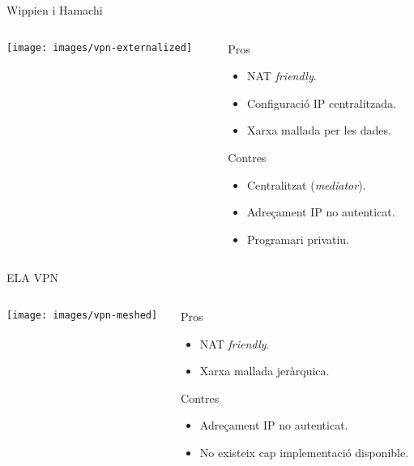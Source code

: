     \begin{frame}{Wippien i Hamachi}
        \begin{columns}
        \begin{column}{0.35\textwidth}
        \texttt{[image: images/vpn-externalized]}
        \end{column}
        \begin{column}{0.65\textwidth}
    	\begin{exampleblock}{Pros}\small
		\begin{itemize}
\item NAT \emph{friendly}.
\item Configuració IP centralitzada.
\item Xarxa mallada per les dades.
		\end{itemize}
	    \end{exampleblock}
	    \begin{alertblock}{Contres}\small
		\begin{itemize}
\item Centralitzat (\emph{mediator}).
\item Adreçament IP no autenticat.
\item Programari privatiu.
		\end{itemize}
       	\end{alertblock}
        \end{column}
        \end{columns}
    \end{frame}
    \begin{frame}{ELA VPN}
        \begin{columns}
        \begin{column}{0.35\textwidth}
        \texttt{[image: images/vpn-meshed]}
        \end{column}
        \begin{column}{0.65\textwidth}
    	\begin{exampleblock}{Pros}\small
		\begin{itemize}
\item NAT \emph{friendly}.
\item Xarxa mallada jeràrquica.
		\end{itemize}
	    \end{exampleblock}
	    \begin{alertblock}{Contres}\small
		\begin{itemize}
\item Adreçament IP no autenticat.
\item No existeix cap implementació disponible.
		\end{itemize}
       	\end{alertblock}
        \end{column}
        \end{columns}
    \end{frame}

